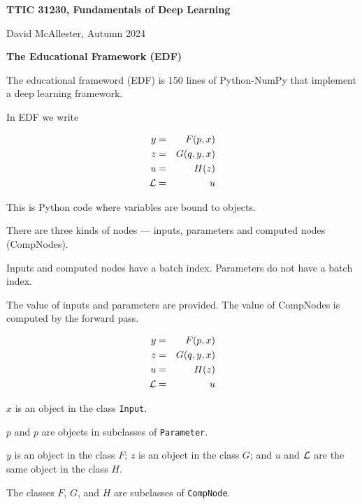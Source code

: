 




{\Huge
  
  \centerline{\bf TTIC 31230, Fundamentals of Deep Learning}
  \bigskip
  \centerline{David McAllester, Autumn 2024}
  \vfill
  \vfill
  \centerline{\bf The Educational Framework (EDF)}
  \vfill
  \vfill


The educational frameword (EDF) is 150 lines of Python-NumPy that implement a deep learning framework.

\vfill
In EDF we write

\vfill
\begin{eqnarray*}
  y & = & F(p,x) \\
  z & = & G(q,y,x) \\
  u & = & H(z) \\
  {\cal L} &  = &  u
\end{eqnarray*}
\medskip

\vfill
This is Python code where variables are bound to objects.


There are three kinds of nodes --- inputs, parameters and computed nodes (CompNodes).

\vfill
Inputs and computed nodes have a batch index.  Parameters do not have a batch index.

\vfill

The value of inputs and parameters are provided. The value of CompNodes is computed by the forward pass.


\begin{eqnarray*}
  y & = & F(p,x) \\
  z & = & G(q,y,x) \\
  u & = & H(z) \\
  {\cal L} &  = &  u
\end{eqnarray*}

\vfill
$x$ is an object in the class {\tt Input}.

\vfill
$p$ and $p$ are objects in subclasses of {\tt Parameter}.

\vfill
$y$ is an object in the class $F$;
$z$ is an object in the class $G$;
and $u$ and ${\cal L}$ are the same object in the class $H$.

\vfill
The classes $F$, $G$, and $H$ are subclasses of {\tt CompNode}.

}
